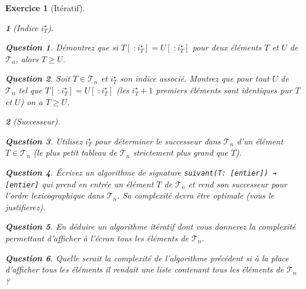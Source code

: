 \documentclass{article}
\theoremstyle{exostyle}
\newtheorem{exo}{Exercice}
\theoremstyle{partiestyle}
\newtheorem{partie}{}[exo]
\theoremstyle{questionstyle}
\newtheorem{questionpartie}{Question}[partie]
\begin{document}
\begin{exo}[Itératif]
\begin{partie}[Indice $i^\star_{T}$]
        \begin{questionpartie}
            Démontrez que si $T[\;:i^\star_{T}] = U[\;:i^\star_{T}]$ pour deux éléments $T$ et $U$ de $\mathcal{T}_n$, alors $T \geq U$.
        \end{questionpartie}
        \begin{questionpartie}
            Soit $T \in \mathcal{T}_n$ et $i^\star_{T}$ son indice associé. Montrez que pour tout $U$ de $\mathcal{T}_n$ tel 
            que $T[\;:i^\star_{T}] = U[\;:i^\star_{T}]$ (les $i^\star_{T} + 1$ premiers éléments sont identiques pur $T$ et $U$) on a $T \geq U$.
        \end{questionpartie}
    \end{partie}
    \begin{partie}[Successeur]
        \begin{questionpartie}
            Utilisez $i^\star_{T}$ pour déterminer le successeur dans $\mathcal{T}_n$ d'un élément $T \in \mathcal{T}_n$ (le plus petit tableau de $\mathcal{T}_n$ strictement plus grand que $T$).
        \end{questionpartie}
        \begin{questionpartie}
            Écrivez un algorithme de signature \verb|suivant(T: [entier]) → [entier]|  qui prend en entrée un élément $T$ de $\mathcal{T}_n$ et rend son successeur pour l'ordre lexicographique dans $\mathcal{T}_n$. Sa complexité devra être optimale (vous le justifierez).
        \end{questionpartie}
        \begin{questionpartie}
            En déduire un algorithme itératif dont vous donnerez la complexité permettant d'afficher à l'écran tous les éléments de $\mathcal{T}_n$.
        \end{questionpartie}
        \begin{questionpartie}
            Quelle serait la complexité de l'algorithme précédent si à la place d'afficher tous les éléments il rendait une liste contenant tous les éléments de $\mathcal{T}_n$ ?
        \end{questionpartie}

    \end{partie}
\end{exo}
\end{document}
